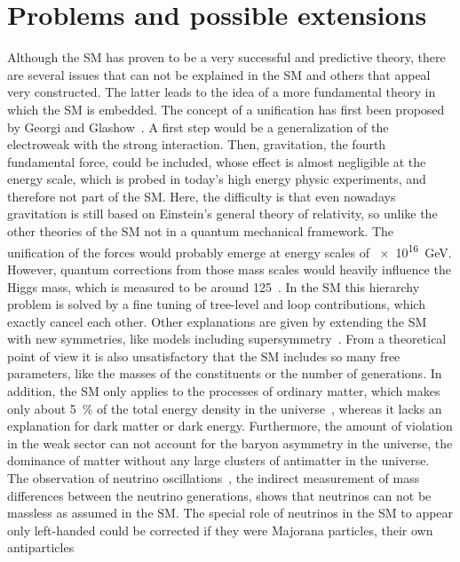
\section{Problems and possible extensions}
\label{sec:standardmodel:extensions}

Although the SM has proven to be a very successful and predictive theory,
there are several issues that can not be explained in the SM and others that
appeal very constructed. The latter leads to the idea of a more fundamental
theory in which the SM is embedded. The concept of a unification has first
been proposed by Georgi and Glashow~\cite{Georgi:1974sy}. A first step would
be a generalization of the electroweak with the strong interaction. Then,
gravitation, the fourth fundamental force, could be included, whose effect is
almost negligible at the energy scale, which is probed in today's high energy
physic experiments, and therefore not part of the SM. Here, the difficulty is
that even nowadays gravitation is still based on Einstein's general theory of
relativity, so unlike the other theories of the SM not in a quantum mechanical
framework. The unification of the forces would probably emerge at energy
scales of \SI{e16}{\GeV}. However, quantum corrections from those mass scales
would heavily influence the Higgs mass, which is measured to be around
\SI{125}{\GeVcc}~\cite{HiggsMass}. In the SM this hierarchy problem is
solved by a fine tuning of tree-level and loop contributions, which exactly
cancel each other. Other explanations are given by extending the SM with new
symmetries, like models including
supersymmetry~\cite{Gervais:1971ji,Golfand:1971iw,Volkov:1972jx,*Volkov:1973ix}.
From a theoretical point of view it is also unsatisfactory that the SM
includes so many free parameters, like the masses of the constituents or the
number of generations. In addition, the SM only applies to the processes of
ordinary matter, which makes only about \SI{5}{\percent} of the total energy
density in the universe~\cite{Ade:2015xua}, whereas it lacks an explanation
for dark matter or dark energy. Furthermore, the amount of \CP violation in
the weak sector can not account for the baryon asymmetry in the universe, \ie
the dominance of matter without any large clusters of antimatter in the
universe. The observation of neutrino
oscillations~\cite{Fukuda:1998mi,Ahmad:2001an,*Ahmad:2002jz}, \ie the indirect
measurement of mass differences between the neutrino generations, shows that
neutrinos can not be massless as assumed in the SM. The special role of
neutrinos in the SM to appear only left-handed could be corrected if they were
Majorana particles, \ie their own antiparticles~\cite{Majorana:1937vz}
